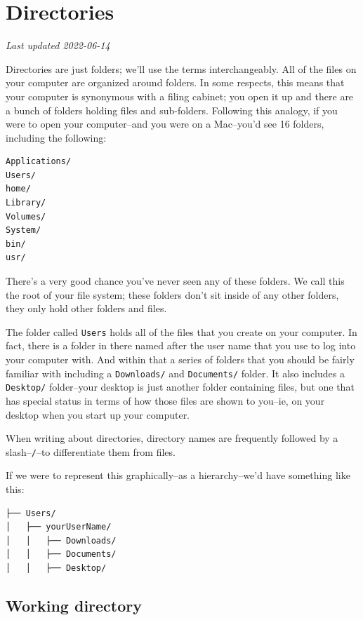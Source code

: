 \documentclass[
]{book}
\begin{document}
\hypertarget{directories}{%
\chapter{Directories}\label{directories}}

\emph{Last updated 2022-06-14}

Directories are just folders; we'll use the terms interchangeably. All of the files on your computer are organized around folders. In some respects, this means that your computer is synonymous with a filing cabinet; you open it up and there are a bunch of folders holding files and sub-folders. Following this analogy, if you were to open your computer--and you were on a Mac--you'd see 16 folders, including the following:

\begin{verbatim}
Applications/
Users/
home/
Library/
Volumes/
System/
bin/
usr/
\end{verbatim}

There's a very good chance you've never seen any of these folders. We call this the root of your file system; these folders don't sit inside of any other folders, they only hold other folders and files.

The folder called \texttt{Users} holds all of the files that you create on your computer. In fact, there is a folder in there named after the user name that you use to log into your computer with. And within that a series of folders that you should be fairly familiar with including a \texttt{Downloads/} and \texttt{Documents/} folder. It also includes a \texttt{Desktop/} folder--your desktop is just another folder containing files, but one that has special status in terms of how those files are shown to you--ie, on your desktop when you start up your computer.

When writing about directories, directory names are frequently followed by a slash--\texttt{/}--to differentiate them from files.

If we were to represent this graphically--as a hierarchy--we'd have something like this:

\begin{verbatim}
├── Users/
│   ├── yourUserName/
│   │   ├── Downloads/
│   │   ├── Documents/
│   │   ├── Desktop/
\end{verbatim}

\hypertarget{working-directory}{%
\section{Working directory}\label{working-directory}}
\end{document}
